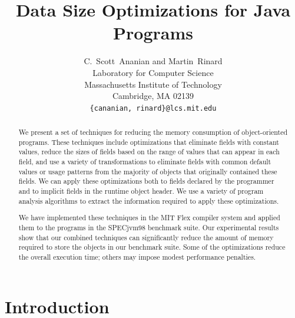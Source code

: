 \documentclass{acmconf}
\title{\bf Data Size Optimizations for Java Programs}
\author{C.~Scott~Ananian and Martin~Rinard\\
        Laboratory for Computer Science\\
        Massachusetts Institute of Technology\\ 
        Cambridge, MA 02139 \\ 
        {\tt \{cananian, rinard\}@lcs.mit.edu} }
\begin{document}


\maketitle

\begin{abstract}
We present a set of techniques for reducing the memory consumption of
object-oriented programs. These techniques 
include optimizations that eliminate fields with
constant values, reduce the sizes of fields based on the range
of values that can appear in each field, and use a variety of
transformations to eliminate fields with common default values
or usage patterns from the majority of objects that originally
contained these fields. We can apply these optimizations both 
to fields declared by the programmer and to implicit fields in
the runtime object header. We use a variety of program analysis 
algorithms to extract the information required to apply these
optimizations. 

We have implemented these techniques in the MIT Flex compiler
system and applied them to the programs in the SPECjvm98 
benchmark suite. Our experimental results show that 
our combined techniques can significantly reduce the amount
of memory required to store the objects in our benchmark
suite.  Some of the optimizations reduce the overall execution time;
others may impose modest performance penalties.

\end{abstract}

\section{Introduction}
\end{document}
